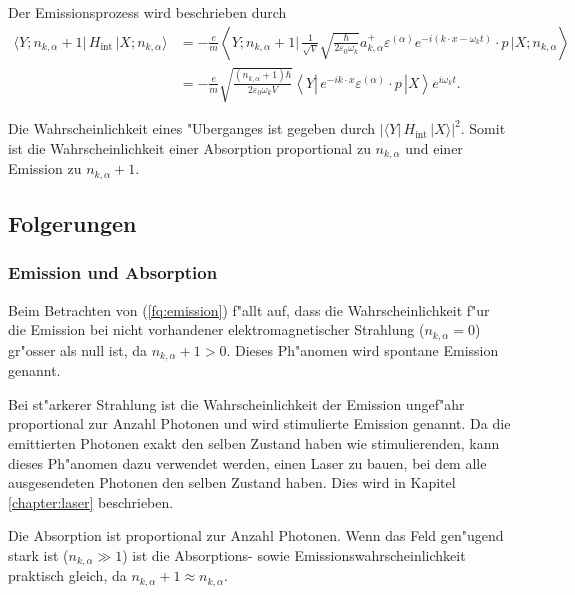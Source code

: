 \begin{refsection}
Der Emissionsprozess wird beschrieben durch
\begin{equation} \label{fq:emission}
\begin{split}
\langle Y; n_{k,\alpha} + 1 |\, H_{\text{int}} \,| X; n_{k,\alpha} \rangle &= 
-\frac{e}{m} \left\langle Y; n_{k,\alpha} + 1 \biggl| 
\, \frac{1}{\sqrt{V}} \sqrt{\frac{\hbar}{2 \varepsilon_0 \omega_k}}a^+_{k,\alpha} \varepsilon^{(\alpha)} e^{-i(k \cdot x-\omega_k t)} \cdot p \,
\biggl| X; n_{k,\alpha} \right\rangle\\
&= -\frac{e}{m} \sqrt{\frac{ (n_{k,\alpha}+1) \hbar}{2 \varepsilon_0 \omega_k V}} \left\langle Y \left| 
\, e^{-ik \cdot x} \varepsilon^{(\alpha)} \cdot p \,
\right| X \right\rangle e^{i\omega_k t}.
\end{split}
\end{equation}

Die Wahrscheinlichkeit eines "Uberganges ist gegeben durch $| \langle Y| \, H_{\text{int}} \, |X \rangle |^2$.
Somit ist die Wahrscheinlichkeit einer Absorption proportional zu $n_{k,\alpha}$ und einer Emission zu $n_{k,\alpha}+1$.

\subsection{Folgerungen}
\subsubsection{Emission und Absorption}
Beim Betrachten von (\ref{fq:emission}) f"allt auf, dass die Wahrscheinlichkeit f"ur die Emission bei nicht vorhandener elektromagnetischer Strahlung ($n_{k,\alpha} = 0$) gr"osser als null ist, da $n_{k,\alpha}+1 > 0$. Dieses Ph"anomen wird spontane Emission genannt.

Bei st"arkerer Strahlung ist die Wahrscheinlichkeit der Emission ungef"ahr proportional zur Anzahl Photonen und wird stimulierte Emission genannt. Da die emittierten Photonen exakt den selben Zustand haben wie stimulierenden, kann dieses Ph"anomen dazu verwendet werden, einen Laser zu bauen, bei dem alle ausgesendeten Photonen den selben Zustand haben. Dies wird in Kapitel \ref{chapter:laser} beschrieben.

Die Absorption ist proportional zur Anzahl Photonen. Wenn das Feld gen"ugend stark ist ($n_{k,\alpha} \gg 1$) ist die Absorptions- sowie Emissionswahrscheinlichkeit praktisch gleich, da $n_{k,\alpha}+1 \approx n_{k,\alpha}$. 


\end{refsection}
